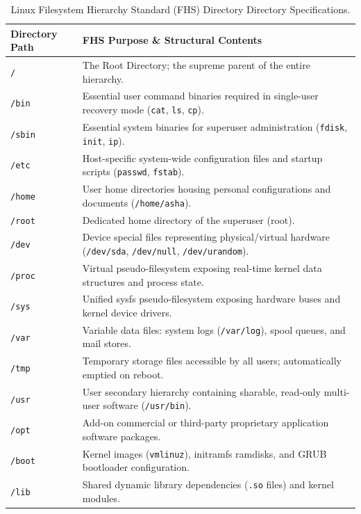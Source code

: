 \begin{table}[htbp]
\centering
\small
\begin{tabularx}{\linewidth}{l X}
\toprule
\textbf{Directory Path} & \textbf{FHS Purpose \& Structural Contents} \\
\midrule
\texttt{/} & The Root Directory; the supreme parent of the entire hierarchy. \\
\texttt{/bin} & Essential user command binaries required in single-user recovery mode (\texttt{cat}, \texttt{ls}, \texttt{cp}). \\
\texttt{/sbin} & Essential system binaries for superuser administration (\texttt{fdisk}, \texttt{init}, \texttt{ip}). \\
\texttt{/etc} & Host-specific system-wide configuration files and startup scripts (\texttt{passwd}, \texttt{fstab}). \\
\texttt{/home} & User home directories housing personal configurations and documents (\texttt{/home/asha}). \\
\texttt{/root} & Dedicated home directory of the superuser (root). \\
\texttt{/dev} & Device special files representing physical/virtual hardware (\texttt{/dev/sda}, \texttt{/dev/null}, \texttt{/dev/urandom}). \\
\texttt{/proc} & Virtual pseudo-filesystem exposing real-time kernel data structures and process state. \\
\texttt{/sys} & Unified sysfs pseudo-filesystem exposing hardware buses and kernel device drivers. \\
\texttt{/var} & Variable data files: system logs (\texttt{/var/log}), spool queues, and mail stores. \\
\texttt{/tmp} & Temporary storage files accessible by all users; automatically emptied on reboot. \\
\texttt{/usr} & User secondary hierarchy containing sharable, read-only multi-user software (\texttt{/usr/bin}). \\
\texttt{/opt} & Add-on commercial or third-party proprietary application software packages. \\
\texttt{/boot} & Kernel images (\texttt{vmlinuz}), initramfs ramdisks, and GRUB bootloader configuration. \\
\texttt{/lib} & Shared dynamic library dependencies (\texttt{.so} files) and kernel modules. \\
\bottomrule
\end{tabularx}
\caption{Linux Filesystem Hierarchy Standard (FHS) Directory Directory Specifications.}
\label{tab:fhs}
\end{table}

